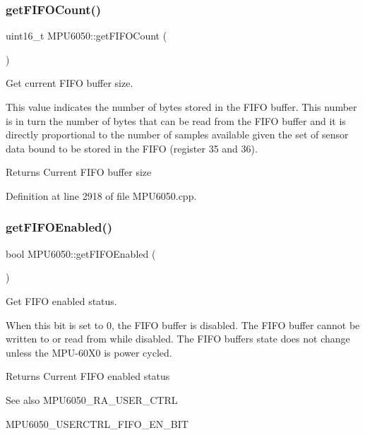 \subsubsection{\texorpdfstring{getFIFOCount()}{getFIFOCount()}}
{\footnotesize\ttfamily uint16\+\_\+t M\+P\+U6050\+::get\+F\+I\+F\+O\+Count (\begin{DoxyParamCaption}{ }\end{DoxyParamCaption})}



Get current F\+I\+FO buffer size. 

This value indicates the number of bytes stored in the F\+I\+FO buffer. This number is in turn the number of bytes that can be read from the F\+I\+FO buffer and it is directly proportional to the number of samples available given the set of sensor data bound to be stored in the F\+I\+FO (register 35 and 36). \begin{DoxyReturn}{Returns}
Current F\+I\+FO buffer size 
\end{DoxyReturn}


Definition at line 2918 of file M\+P\+U6050.\+cpp.

\mbox{\label{classMPU6050_ae2687a09ebe0d7fbbf74f560e0dd9a44}} 
\subsubsection{\texorpdfstring{getFIFOEnabled()}{getFIFOEnabled()}}
{\footnotesize\ttfamily bool M\+P\+U6050\+::get\+F\+I\+F\+O\+Enabled (\begin{DoxyParamCaption}{ }\end{DoxyParamCaption})}



Get F\+I\+FO enabled status. 

When this bit is set to 0, the F\+I\+FO buffer is disabled. The F\+I\+FO buffer cannot be written to or read from while disabled. The F\+I\+FO buffer\textquotesingle{}s state does not change unless the M\+P\+U-\/60\+X0 is power cycled. \begin{DoxyReturn}{Returns}
Current F\+I\+FO enabled status 
\end{DoxyReturn}
\begin{DoxySeeAlso}{See also}
M\+P\+U6050\+\_\+\+R\+A\+\_\+\+U\+S\+E\+R\+\_\+\+C\+T\+RL 

M\+P\+U6050\+\_\+\+U\+S\+E\+R\+C\+T\+R\+L\+\_\+\+F\+I\+F\+O\+\_\+\+E\+N\+\_\+\+B\+IT 
\end{DoxySeeAlso}


